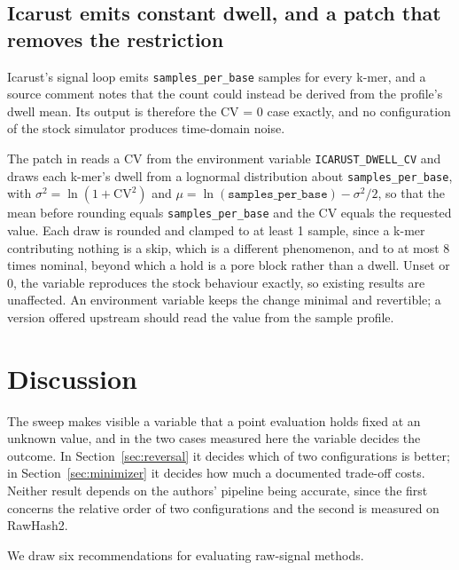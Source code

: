 \documentclass[11pt,a4paper]{article}
\begin{document}
\subsection{Icarust emits constant dwell, and a patch that removes the restriction}\label{sec:icarust}

Icarust's signal loop emits \texttt{samples\_per\_base} samples for every k-mer, and a source
comment notes that the count could instead be derived from the profile's dwell mean. Its output is
therefore the CV = 0 case exactly, and no configuration of the stock simulator produces
time-domain noise.

The patch in  reads a CV from the
environment variable \texttt{ICARUST\_DWELL\_CV} and draws each k-mer's dwell from a lognormal
distribution about \texttt{samples\_per\_base}, with $\sigma^2 = \ln(1 + \mathrm{CV}^2)$ and
$\mu = \ln(\texttt{samples\_per\_base}) - \sigma^2/2$, so that the mean before rounding equals
\texttt{samples\_per\_base} and the CV equals the requested value. Each draw is rounded and clamped
to at least 1 sample, since a k-mer contributing nothing is a skip, which is a different
phenomenon, and to at most 8 times nominal, beyond which a hold is a pore block rather than a
dwell. Unset or 0, the variable reproduces the stock behaviour exactly, so existing results are
unaffected. An environment variable keeps the change minimal and revertible; a version offered
upstream should read the value from the sample profile.

\section{Discussion}\label{sec:discussion}

The sweep makes visible a variable that a point evaluation holds fixed at an unknown value, and in
the two cases measured here the variable decides the outcome. In Section~\ref{sec:reversal} it
decides which of two configurations is better; in Section~\ref{sec:minimizer} it decides how much a
documented trade-off costs. Neither result depends on the authors' pipeline being accurate, since
the first concerns the relative order of two configurations and the second is measured on
RawHash2.

We draw six recommendations for evaluating raw-signal methods.
\end{document}
